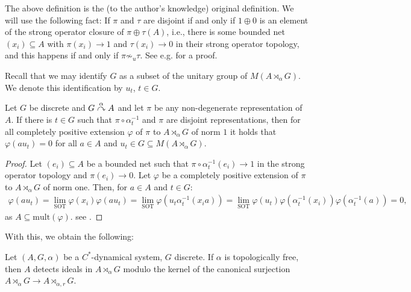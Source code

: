 \begin{remark}
	The above definition is the (to the author's knowledge) original definition. We will use the following fact: If $\pi$ and $\tau$ are disjoint if and only if $1 \oplus 0$ is an element of the strong operator closure of $\pi \oplus \tau (A)$, i.e., there is some bounded net $(x_i) \subseteq A$ with $\pi(x_i) \to 1$ and $\tau(x_i) \to 0$ in their strong operator topology, and this happens if and only if $\pi \not \sim _u \tau$. See e.g. \cite[Proposition 2.1.4]{arveson2012invitation} for a proof. 
\end{remark}
Recall that we may identify $G$ as a subset of the unitary group of $M(A \rtimes_\alpha G)$. We denote this identification by $u_t$, $t \in G$. 
\begin{lemma}
	Let $G$ be discrete and $G \stackrel{\alpha}{\curvearrowright} A$ and let $\pi$ be any non-degenerate representation of $A$. If there is $t \in G$ such that $\pi \circ \alpha_t^{-1}$ and $\pi$ are disjoint representations, then for all completely positive extension $\varphi$ of $\pi$ to $A \rtimes_\alpha G$ of norm $1$ it holds that $\varphi(a u_t) = 0$ for all $a \in A$ and $u_t \in G \subseteq M(A \rtimes_\alpha G)$.
	\label{ASlem1}
\end{lemma}
\begin{proof}
	Let $(e_i) \subseteq A$ be a bounded net such that $\pi  \circ \alpha_{t}^{-1}(e_i) \to 1$ in the strong operator topology and $\pi(e_i) \to 0$. Let $\varphi$ be a completely positive extension of $\pi$ to $A  \rtimes_\alpha G$ of norm one. Then, for $a \in A$ and $t \in G$:
	\begin{align*}
		\varphi(a u_t) = \lim_{\text{SOT}} \varphi(x_i )\varphi(a u_t) = \lim_{\text{SOT}} \varphi(u_t \alpha_{t}^{-1}(x_i a )) = \lim_{\text{SOT}} \varphi(u_t) \varphi(\alpha_t^{-1}(x_i))\varphi(\alpha_{t}^{-1}(a)) = 0,
	\end{align*}
	as $A \subseteq \mathrm{mult}(\varphi)$.  see \cite[Proposition 1.5.7 p.t (2)]{brown2008c}.
\end{proof}
With this, we obtain the following:
\begin{theorem}
	Let $(A,G,\alpha)$ be a $C^*$-dynamical system, $G$ discrete. If $\alpha$ is topologically free, then $A$ detects ideals in $A \rtimes_{\alpha}G$ modulo the kernel of the canonical surjection $A \rtimes_\alpha G \to A \rtimes_{\alpha,r}G$. 
	\label{ASthm1}
\end{theorem}
